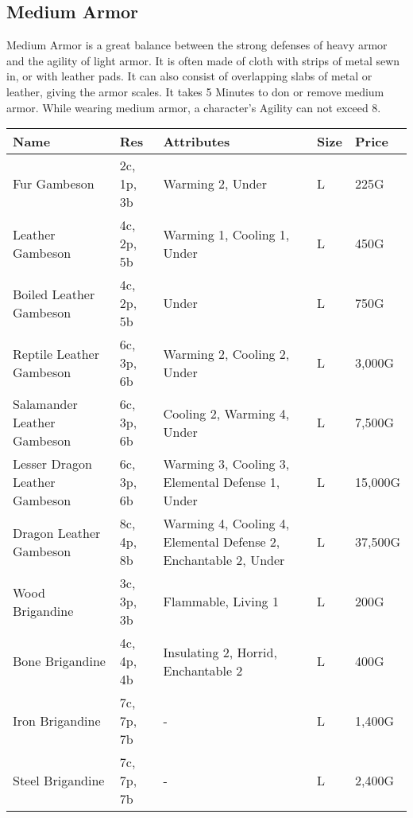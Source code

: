 \subsection{Medium Armor}\label{subsec:mediumArmor}
Medium Armor is a great balance between the strong defenses of heavy armor and the agility of light armor.
It is often made of cloth with strips of metal sewn in, or with leather pads.
It can also consist of overlapping slabs of metal or leather, giving the armor scales.
It takes 5 Minutes to don or remove medium armor.
While wearing medium armor, a character's Agility can not exceed 8.

\begin{longtable}{p{3.5cm} | p{1.5cm} | p{5cm} | p{1cm} | p{1.25cm}}
	Name & Res & Attributes & Size & Price\\ \hline
	
	Fur Gambeson & 2c, 1p, 3b & Warming 2, Under & L & 225G\\
	
	Leather Gambeson & 4c, 2p, 5b & Warming 1, Cooling 1, Under & L & 450G\\
	
	Boiled Leather Gambeson & 4c, 2p, 5b & Under & L & 750G\\
	
	Reptile Leather Gambeson & 6c, 3p, 6b & Warming 2, Cooling 2, Under & L & 3,000G\\
	
	Salamander Leather Gambeson & 6c, 3p, 6b & Cooling 2, Warming 4, Under & L & 7,500G\\
	
	Lesser Dragon Leather Gambeson & 6c, 3p, 6b & Warming 3, Cooling 3, Elemental Defense 1, Under & L & 15,000G\\
	
	Dragon Leather Gambeson & 8c, 4p, 8b & Warming 4, Cooling 4, Elemental Defense 2, Enchantable 2, Under & L & 37,500G\\
	
	Wood Brigandine & 3c, 3p, 3b & Flammable, Living 1 & L & 200G\\
	
	Bone Brigandine & 4c, 4p, 4b & Insulating 2, Horrid, Enchantable 2 & L & 400G\\
	
	Iron Brigandine & 7c, 7p, 7b & - & L & 1,400G\\
	
	Steel Brigandine & 7c, 7p, 7b & - & L & 2,400G\\
	

\end{longtable}
